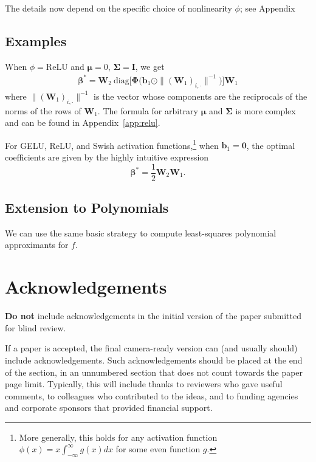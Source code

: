 \documentclass{article}
\theoremstyle{plain}
\theoremstyle{definition}
\theoremstyle{remark}
\newcommand{\aalpha}{\boldsymbol{\alpha}}
\newcommand{\bbeta}{\boldsymbol{\beta}}
\newcommand{\mmu}{\boldsymbol{\mu}}
\newcommand{\Pphi}{\boldsymbol{\Phi}}
\newcommand{\SSigma}{\boldsymbol{\Sigma}}
\begin{document}
The details now depend on the specific choice of nonlinearity $\phi$; see Appendix

\subsection{Examples}

When $\phi = \mathrm{ReLU}$ and $\mmu = 0$, $\SSigma = \mathbf{I}$, we get
\begin{align}
    \bbeta^* = \mathbf{W}_2 \:\mathrm{diag} \Big [ \Pphi \Big ( \mathbf{b}_1 \odot \| (\mathbf{W}_1)_{i, \cdot} \|^{-1} \Big ) \Big ] \mathbf{W}_1 %
\end{align}
where $\| (\mathbf{W}_1)_{i, \cdot} \|^{-1}$ is the vector whose components are the reciprocals of the norms of the rows of $\mathbf{W}_1$. The formula for arbitrary $\mmu$ and $\SSigma$ is more complex and can be found in Appendix~\ref{app:relu}.

For GELU, ReLU, and Swish activation functions,\footnote{More generally, this holds for any activation function $\phi(x) = x \int_{-\infty}^{\infty} g(x) dx$ for some even function $g$.} when $\mathbf{b}_1 = \boldsymbol{0}$, the optimal coefficients are given by the highly intuitive expression
\begin{equation}
    \bbeta^* = \frac{1}{2} \mathbf{W}_2 \mathbf{W}_1.
\end{equation}

\subsection{Extension to Polynomials}

We can use the same basic strategy to compute least-squares polynomial approximants for $f$.

\section*{Acknowledgements}

\textbf{Do not} include acknowledgements in the initial version of
the paper submitted for blind review.

If a paper is accepted, the final camera-ready version can (and
usually should) include acknowledgements.  Such acknowledgements
should be placed at the end of the section, in an unnumbered section
that does not count towards the paper page limit. Typically, this will 
include thanks to reviewers who gave useful comments, to colleagues 
who contributed to the ideas, and to funding agencies and corporate 
sponsors that provided financial support.
\end{document}
